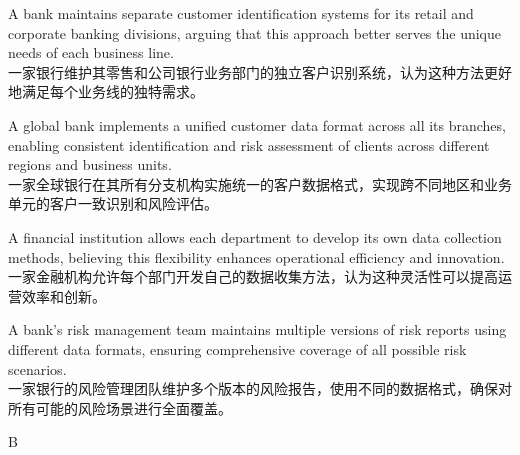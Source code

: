 \documentclass{article}
\begin{document}
\begin{choices}
    \item A bank maintains separate customer identification systems for its retail and corporate banking divisions, arguing that this approach better serves the unique needs of each business line. \\
    一家银行维护其零售和公司银行业务部门的独立客户识别系统，认为这种方法更好地满足每个业务线的独特需求。
    
    \item A global bank implements a unified customer data format across all its branches, enabling consistent identification and risk assessment of clients across different regions and business units. \\
    一家全球银行在其所有分支机构实施统一的客户数据格式，实现跨不同地区和业务单元的客户一致识别和风险评估。
    
    \item A financial institution allows each department to develop its own data collection methods, believing this flexibility enhances operational efficiency and innovation. \\
    一家金融机构允许每个部门开发自己的数据收集方法，认为这种灵活性可以提高运营效率和创新。
    
    \item A bank's risk management team maintains multiple versions of risk reports using different data formats, ensuring comprehensive coverage of all possible risk scenarios. \\
    一家银行的风险管理团队维护多个版本的风险报告，使用不同的数据格式，确保对所有可能的风险场景进行全面覆盖。
\end{choices}

\begin{correctanswer}
    B
\end{correctanswer}
\end{document}
